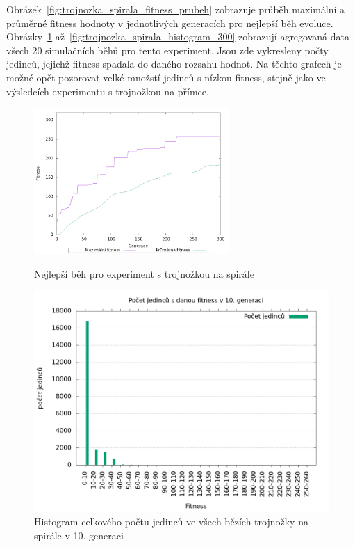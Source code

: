 Obrázek~\ref{fig:trojnozka_spirala_fitness_prubeh} zobrazuje průběh maximální a průměrné fitness hodnoty v jednotlivých generacích pro nejlepší běh evoluce.
Obrázky~\ref{fig:trojnozka_spirala_histogram_10} až~\ref{fig:trojnozka_spirala_histogram_300} zobrazují agregovaná data všech 20 simulačních běhů pro tento experiment.
Jsou zde vykresleny počty jedinců, jejichž fitness spadala do daného rozsahu hodnot.
Na těchto grafech je možné opět pozorovat velké množstí jedinců s nízkou fitness, stejně jako ve výsledcích experimentu s trojnožkou na přímce.

\begin{figure}[h]
    \begin{minipage}[c]{0.48\linewidth}
    {\includegraphics[width=20em]{obrazky/trojnozka_spirala_fitness_prubeh.png}}
        \caption{
        Nejlepší běh pro experiment s trojnožkou na spirále
        }
        \label{fig:trojnozka_spirala_fitness_prubeh}

    \end{minipage}
    \hfill
    \begin{minipage}[c]{0.48\linewidth}
        \includegraphics[width=\linewidth]{obrazky/trojnozka_spirala_fitnessHistogram10.png}
        \caption{Histogram celkového počtu jedinců ve všech bězích trojnožky na spirále v 10. generaci}
        \label{fig:trojnozka_spirala_histogram_10}
    \end{minipage}
\end{figure}

